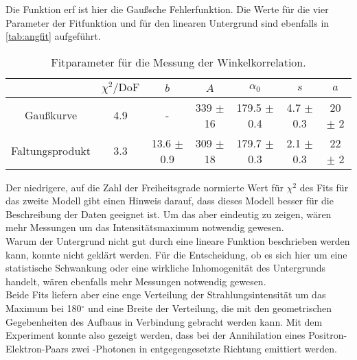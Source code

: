 Die Funktion erf ist hier die Gaußsche Fehlerfunktion.
Die Werte für die vier Parameter der Fitfunktion und für den linearen Untergrund sind ebenfalls
in \autoref{tab:angfit} aufgeführt.

\begin{table}[H]
\caption{Fitparameter für die Messung der Winkelkorrelation.}
\begin{center}
\begin{tabular}{|c|c|c|c|c|c|c|}
  \hline
   & $\chi^2 / \text{DoF}$ & $b$ & $A$ & $\alpha_0$ & $s$ & $a$ \\ \hline  
 Gaußkurve  & 4.9 & - & 339 $\pm$ 16 & 179.5 $\pm$ 0.4 & 4.7 $\pm$ 0.3 & 20 $\pm$ 2 \\ \hline  
 Faltungsprodukt & 3.3 & 13.6 $\pm$ 0.9 & 309 $\pm$ 18  & 179.7 $\pm$ 0.3 & 2.1 $\pm$ 0.3 & 22 $\pm$ 2 \\ \hline 
 
\end{tabular}
\end{center}
\label{tab:angfit}
\end{table}

Der niedrigere, auf die Zahl der Freiheitsgrade normierte Wert für $\chi^2$ des Fits für das zweite Modell
gibt einen Hinweis darauf, dass dieses Modell besser für die Beschreibung der Daten geeignet ist.
Um das aber eindeutig zu zeigen, wären mehr Messungen um das Intensitätsmaximum notwendig gewesen.\\
Warum der Untergrund nicht gut durch eine lineare Funktion beschrieben werden kann,
konnte nicht geklärt werden.
Für die Entscheidung, ob es sich hier um eine statistische Schwankung oder eine wirkliche
Inhomogenität des Untergrunds handelt, wären ebenfalls mehr Messungen notwendig gewesen.\\
Beide Fits liefern aber eine enge Verteilung der Strahlungsintensität um das Maximum bei 180$^\circ$
und eine Breite der Verteilung, die mit den geometrischen Gegebenheiten des Aufbaus in Verbindung gebracht
werden kann.
Mit dem Experiment konnte also gezeigt werden, dass bei der Annihilation eines Positron-Elektron-Paars
zwei \textgamma-Photonen in entgegengesetzte Richtung emittiert werden.


